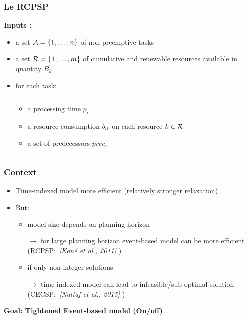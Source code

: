 
\begin{frame}
  \frametitle{Le RCPSP}
 \vspace{0.4cm}
 \textbf{Inputs : }
 \vspace{0.4cm}
  \begin{itemize}
  \item a set ${\cal A}=\{1,\dots ,n\}$ of non-preemptive tasks
    \vspace{0.4cm}
  \item a set ${\cal R}=\{1,\dots ,m\}$ of cumulative and renewable resources available in quantity $B_k$
      \vspace{0.4cm}
  \item<2-> for each task:
    \begin{columns}
      \hfill
      \begin{column}{0.5\linewidth}
        \begin{itemize}
          \vspace{-0.6cm}
        \item<2-> \footnotesize  a processing time $p_i$
          \vspace{0.25cm}
        \item<3-> \footnotesize a resource consumption $b_{ik}$ on each
          resource $k \in {\cal R}$ 
          \vspace{0.25cm}
        \item<4-> \footnotesize a set of predecessors $prec_i $
          \vspace{0.25cm}
        \end{itemize}
      \end{column}
      \hfill
      \begin{column}{0.4\linewidth}
        \centering
          
      \end{column} 
      \hfill
    \end{columns}
  \end{itemize} 
\end{frame}


\begin{frame}
  \frametitle{Context}
  \begin{itemize}
  \item Time-indexed model more efficient {\small (relatively stronger relaxation)}
    \vfill
  \item But:
    \begin{itemize}
    \item  model size depends on planning horizon 
      
      $\longrightarrow $ for large planning horizon event-based model can be more
      efficient (RCPSP:~{\color{gray!50!black!70}\it [Koné et al.,
        2011]} )
      \vfill
    \item  if only non-integer solutions
      
      $\longrightarrow$ time-indexed model can lead to
      infeasible/sub-optimal solution
      (CECSP:~{\color{gray!50!black!70}\it [Nattaf et al., 2015]} )
    \end{itemize}
  \end{itemize}
\vfill
{\bf Goal: Tightened Event-based model (On/off)} 
\end{frame}

